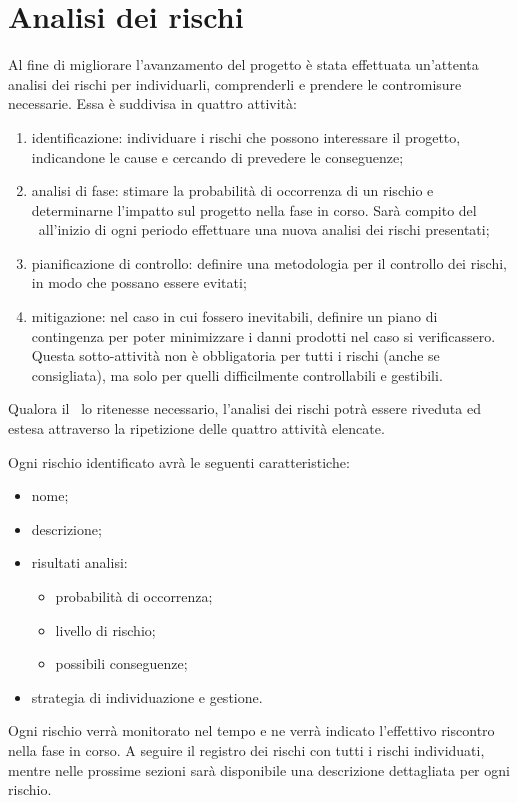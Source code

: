 \documentclass[../PianoProgetto.tex]{subfiles}
\begin{document}
\section{Analisi dei rischi}

	Al fine di migliorare l'avanzamento del progetto è stata effettuata un'attenta analisi dei rischi per individuarli, comprenderli e prendere le contromisure necessarie. Essa è suddivisa in quattro attività:
	\begin{enumerate}
	\item identificazione: individuare i rischi che possono interessare il progetto, indicandone le cause e cercando di prevedere le conseguenze;
	\item analisi di fase: stimare la probabilità di occorrenza di un rischio e determinarne l'impatto sul progetto nella fase in corso. Sarà compito del \responsabilediprogetto\  all'inizio di ogni periodo effettuare una nuova analisi dei rischi presentati;
	\item pianificazione di controllo: definire una metodologia per il controllo dei rischi, in modo che possano essere evitati;
	\item mitigazione: nel caso in cui fossero inevitabili, definire un piano di contingenza per poter minimizzare i danni prodotti nel caso si verificassero. Questa sotto-attività non è obbligatoria per tutti i rischi (anche se consigliata), ma solo per quelli difficilmente controllabili e gestibili.
	\end{enumerate}
    Qualora il \responsabilediprogetto\ lo ritenesse necessario, l'analisi dei rischi potrà essere riveduta ed estesa attraverso la ripetizione delle quattro attività elencate.

	Ogni rischio identificato avrà le seguenti caratteristiche: 
		\begin{itemize}
			\item nome;
			\item descrizione; 
			\item risultati analisi:
			\begin{itemize}
				\item probabilità di occorrenza;
				\item livello di rischio;
				\item possibili conseguenze;
			\end{itemize}
			\item strategia di individuazione e gestione.
		\end{itemize}	
	Ogni rischio verrà monitorato nel tempo e ne verrà indicato l'effettivo riscontro nella fase in corso.
    A seguire il registro dei rischi con tutti i rischi individuati, mentre nelle prossime sezioni sarà disponibile una descrizione dettagliata per ogni rischio.
		
\end{document}
